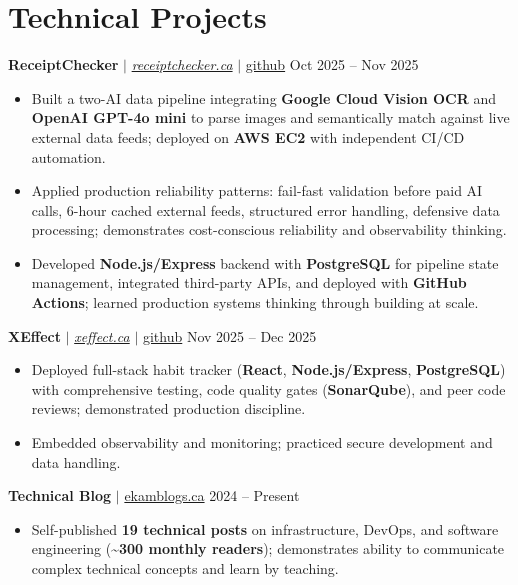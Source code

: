 \documentclass[11pt,a4paper]{article}
\begin{document}
\section{Technical Projects}

\textbf{ReceiptChecker} $|$ \href{https://receiptchecker.ca/}{\emph{receiptchecker.ca}} $|$ \href{https://github.com/bhat0155/receipt-check}{\small github} \hfill Oct 2025 -- Nov 2025
\begin{itemize}
    \item Built a two-AI data pipeline integrating \textbf{Google Cloud Vision OCR} and \textbf{OpenAI GPT-4o mini} to parse images and semantically match against live external data feeds; deployed on \textbf{AWS EC2} with independent CI/CD automation.
    \item Applied production reliability patterns: fail-fast validation before paid AI calls, 6-hour cached external feeds, structured error handling, defensive data processing; demonstrates cost-conscious reliability and observability thinking.
    \item Developed \textbf{Node.js/Express} backend with \textbf{PostgreSQL} for pipeline state management, integrated third-party APIs, and deployed with \textbf{GitHub Actions}; learned production systems thinking through building at scale.
\end{itemize}

\vspace{4pt}

\textbf{XEffect} $|$ \href{https://www.xeffect.ca/app}{\emph{xeffect.ca}} $|$ \href{https://github.com/bhat0155/xeffect}{\small github} \hfill Nov 2025 -- Dec 2025
\begin{itemize}
    \item Deployed full-stack habit tracker (\textbf{React}, \textbf{Node.js/Express}, \textbf{PostgreSQL}) with comprehensive testing, code quality gates (\textbf{SonarQube}), and peer code reviews; demonstrated production discipline.
    \item Embedded observability and monitoring; practiced secure development and data handling.
\end{itemize}

\vspace{4pt}

\textbf{Technical Blog} $|$ \href{https://www.ekamblogs.ca}{ekamblogs.ca} \hfill 2024 -- Present
\begin{itemize}
    \item Self-published \textbf{19 technical posts} on infrastructure, DevOps, and software engineering (\textasciitilde\textbf{300 monthly readers}); demonstrates ability to communicate complex technical concepts and learn by teaching.
\end{itemize}
\end{document}
